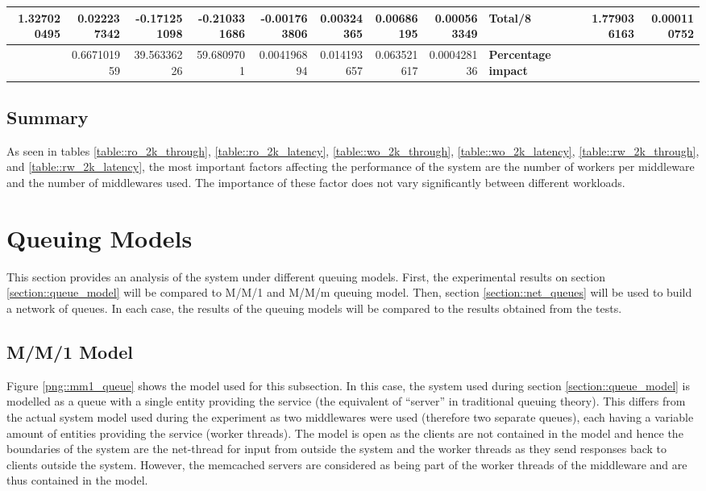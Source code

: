 \documentclass[11pt,a4paper]{article}
\begin{document}
{\begin{landscape}
{\begin{tabular}{|*{15}{r|}}
                \hline 1.327020495 & 0.022237342 & -0.171251098 & -0.210331686 & -0.001763806 & 0.00324365 & 0.00686195 & 0.000563349 & \multicolumn{3}{|l|}{\textbf{Total/8}} & \multicolumn{2}{|r|}{} & 1.779036163 & 0.000110752 \\
                \hline & 0.667101959 & 39.56336226 & 59.6809701 & 0.004196894 & 0.014193657 & 0.063521617 & 0.000428136 & \multicolumn{3}{|l|}{\textbf{Percentage impact}} & \multicolumn{4}{|l|}{} \\
                \hline
            \end{tabular}
        }
        \label{table::rw_2k_latency}

    \end{landscape}
    \clearpage%
}

\subsection{Summary}
As seen in tables \ref{table::ro_2k_through}, \ref{table::ro_2k_latency}, \ref{table::wo_2k_through}, \ref{table::wo_2k_latency}, \ref{table::rw_2k_through}, and \ref{table::rw_2k_latency}, the most important factors affecting the performance of the system are the number of workers per middleware and the number of middlewares used. The importance of these factor does not vary significantly between different workloads.


\newpage

\section{Queuing Models}
This section provides an analysis of the system under different queuing models. First, the experimental results on section \ref{section::queue_model} will be compared to M/M/1 and M/M/m queuing model. Then, section \ref{section::net_queues} will be used to build a network of queues. In each case, the results of the queuing models will be compared to the results obtained from the tests.

\subsection{M/M/1 Model}
Figure \ref{png::mm1_queue} shows the model used for this subsection. In this case, the system used during section \ref{section::queue_model} is modelled as a queue with a single entity providing the service (the equivalent of ``server'' in traditional queuing theory). This differs from the actual system model used during the experiment as two middlewares were used (therefore two separate queues), each having a variable amount of entities providing the service (worker threads). The model is open as the clients are not contained in the model and hence the boundaries of the system are the net-thread for input from outside the system and the worker threads as they send responses back to clients outside the system. However, the memcached servers are considered as being part of the worker threads of the middleware and are thus contained in the model.
\end{document}
